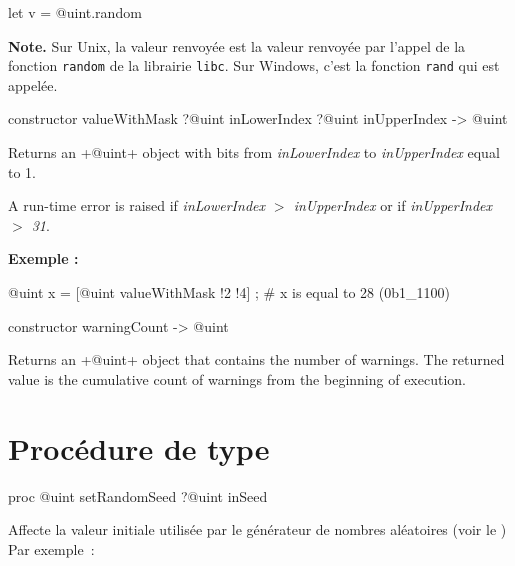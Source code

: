 \begin{galgas}
  let v = @uint.random
\end{galgas}


{\bf Note. } Sur Unix, la valeur renvoyée est la valeur renvoyée par l'appel de la fonction \texttt{random} de la librairie \texttt{libc}. Sur Windows, c'est la fonction \texttt{rand} qui est appelée.



\begin{galgas}
constructor valueWithMask ?@uint inLowerIndex ?@uint inUpperIndex -> @uint
\end{galgas}


Returns an \ggs+@uint+ object with bits from \emph{inLowerIndex} to \emph{inUpperIndex} equal to 1.

A run-time error is raised if \emph{inLowerIndex $>$ inUpperIndex} or if \emph{inUpperIndex $>$ 31}.



\textbf{Exemple :}
\begin{galgas}
@uint x = [@uint valueWithMask !2 !4] ; # x is equal to 28 (0b1_1100)
\end{galgas}





\begin{galgas}
constructor warningCount -> @uint
\end{galgas}


Returns an \ggs+@uint+ object that contains the number of warnings. The returned value is the cumulative count of warnings from the beginning of execution.





\section{Procédure de type}




\begin{galgasbox}
proc @uint setRandomSeed ?@uint inSeed
\end{galgasbox}

Affecte la valeur initiale utilisée par le générateur de nombres aléatoires (voir le ) Par exemple~:

\begin{galgas}
\end{galgas}







